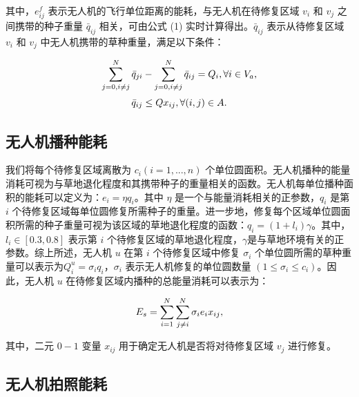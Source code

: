 \documentclass[AutoFakeBold]{LZUThesis}
\begin{document}
其中，$e^f_{ij}$ 表示无人机的飞行单位距离的能耗，与无人机在待修复区域 $v_i$ 和 $v_j$ 之间携带的种子重量 $\bar{q}_{ij}$ 相关，可由公式 (1) 实时计算得出。$\bar{q}_{ij}$ 表示从待修复区域 $v_i$ 和 $v_j$ 中无人机携带的草种重量，满足以下条件：

\begin{equation} \label{remained-weight}
	\begin{scriptsize}
		\sum^N_{j=0, i\neq j}\bar{q}_{ji} -  \sum^N_{j=0, i\neq j}\bar{q}_{ij} = Q_i, \forall i \in V_a,
	\end{scriptsize}
\end{equation}
\begin{equation} \label{demanded-weight}
	\begin{small}
		\bar{q}_{ij} \leq Q x_{ij}, \forall (i,j) \in A.
	\end{small}
\end{equation}

\subsection{无人机播种能耗}

我们将每个待修复区域离散为 $c_i(i = 1, ..., n)$ 个单位圆面积。无人机播种的能量消耗可视为与草地退化程度和其携带种子的重量相关的函数。无人机每单位播种面积的能耗可以定义为：$e_i = \eta q_i$。其中 $\eta$ 是一个与能量消耗相关的正参数，$q_i$ 是第 $i$ 个待修复区域每单位圆修复所需种子的重量。进一步地，修复每个区域单位圆面积所需的种子重量可视为该区域的草地退化程度的函数\cite{klaus2017enriching}：$q_i = (1 + l_i) \gamma$。其中，$l_i \in [0.3, 0.8]$ 表示第 $i$ 个待修复区域的草地退化程度，$\gamma$是与草地环境有关的正参数。综上所述，无人机 $u$ 在第 $i$ 个待修复区域中修复 $\sigma_i$ 个单位圆所需的草种重量可以表示为$Q^u_i = \sigma_i q_i$，$\sigma_i$ 表示无人机修复的单位圆数量 $(1\leq\sigma_i\leq c_i)$。因此，无人机 $u$ 在待修复区域内播种的总能量消耗可以表示为：

\begin{equation} \label{seeding-energy}
	\begin{small}
		E_s = \sum^N_{i = 1}\sum^N_{j \neq i}\sigma_i e_i x_{ij},
	\end{small}
\end{equation}

其中，二元 $0-1$ 变量 $x_{ij}$ 用于确定无人机是否将对待修复区域 $v_j$ 进行修复。

\subsection{无人机拍照能耗}
\end{document}
